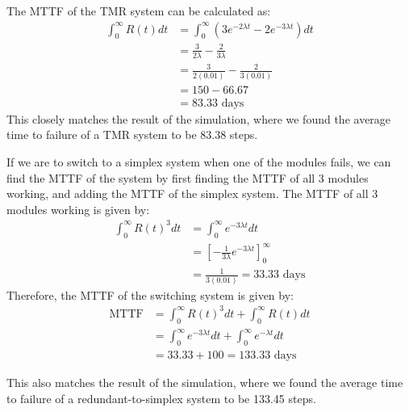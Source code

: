 \documentclass{article}
\begin{document}
The MTTF of the TMR system can be calculated as:
\begin{align*}
    \int_{0}^{\infty} R(t) dt &= \int_{0}^{\infty} (3e^{-2\lambda t} - 2e^{-3\lambda t}) dt \\
    &= \frac{3}{2\lambda} - \frac{2}{3\lambda} \\
    &= \frac{3}{2(0.01)} - \frac{2}{3(0.01)} \\
    &= 150 - 66.67 \\
    &= 83.33 \text{ days}
\end{align*}
This closely matches the result of the simulation, where we found the average time to failure of a TMR system to be 83.38 steps.


If we are to switch to a simplex system when one of the modules fails, we can find the MTTF of the system by first finding the MTTF of all 3 modules working, and adding the MTTF of the simplex system. The MTTF of all 3 modules working is given by:
\begin{align*}
    \int_{0}^{\infty} R(t)^3 dt &= \int_{0}^{\infty} e^{-3\lambda t} dt \\
    &= \left[-\frac{1}{3\lambda} e^{-3\lambda t}\right]_{0}^{\infty} \\
    &= \frac{1}{3(0.01)} = 33.33 \text{ days}
\end{align*}
Therefore, the MTTF of the switching system is given by:
\begin{align*}
    \text{MTTF} &= \int_{0}^{\infty} R(t)^3 dt + \int_{0}^{\infty} R(t) dt \\
    &= \int_{0}^{\infty} e^{-3\lambda t} dt + \int_{0}^{\infty} e^{-\lambda t} dt \\
    &= 33.33 + 100 = 133.33 \text{ days}
\end{align*}

This also matches the result of the simulation, where we found the average time to failure of a redundant-to-simplex system to be 133.45 steps.



\end{document}

